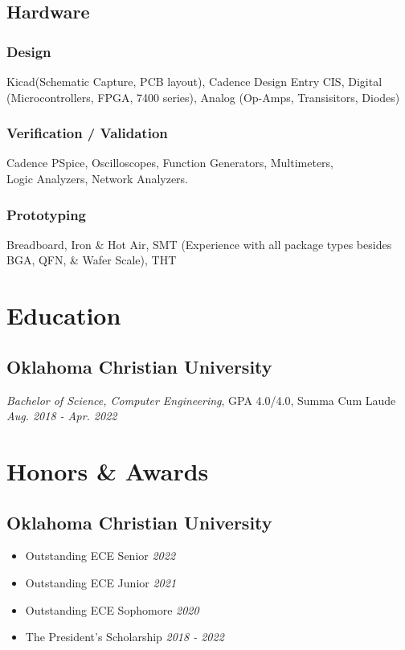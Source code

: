 \documentclass{article}
\begin{document}
\begin{spacing}{.5}
	\subsection{Hardware}
		\subsubsection{Design} \large{ Kicad(Schematic Capture, PCB layout), Cadence Design Entry CIS, Digital} \small{(Microcontrollers, FPGA, 7400 \hspace*{1cm} series)}\large{, Analog} \small{(Op-Amps, Transisitors, Diodes)}
		\subsubsection{Verification / Validation} \large{ Cadence PSpice, Oscilloscopes, Function Generators, Multimeters,\\ \hspace*{1cm} Logic Analyzers, Network Analyzers.}
		\subsubsection{Prototyping} \large{ Breadboard, Iron \& Hot Air, SMT} \small{(Experience with all package types besides BGA, QFN, \& Wafer Scale),} \large{ \hspace*{1cm} THT}

\section{Education}
	\subsection{Oklahoma Christian University}
		\textit{Bachelor of Science, Computer Engineering}, GPA 4.0/4.0, Summa Cum Laude \hfill \small{\textsl{Aug. 2018 - Apr. 2022}}

\section{Honors \& Awards}
	\subsection{Oklahoma Christian University}
		\begin{itemize}[label=$\bullet$,itemsep=-.35ex]
			\item \large{Outstanding ECE Senior} \hfill \small{\textsl{2022}}
			\item \large{Outstanding ECE Junior} \hfill \small{\textsl{2021}}
			\item \large{Outstanding ECE Sophomore} \hfill \small{\textsl{2020}}
			\item \large{The President's Scholarship} \hfill \small{\textsl{2018 - 2022}}
		\end{itemize}

\end{spacing}
\end{document}
